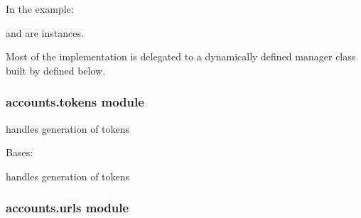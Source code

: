 \documentclass[letterpaper,10pt,english]{sphinxmanual}
\begin{document}
\begin{fulllineitems}
\begin{fulllineitems}
In the example:

\begin{sphinxVerbatim}[commandchars=\\\{\}]
 
       
\end{sphinxVerbatim}

 and  are 
instances.

Most of the implementation is delegated to a dynamically defined manager
class built by  defined below.

\end{fulllineitems}


\end{fulllineitems}



\subsubsection{accounts.tokens module}
\label{\detokenize{accounts:module-accounts.tokens}}\label{\detokenize{accounts:accounts-tokens-module}}
handles generation of tokens

\begin{fulllineitems}
\label{\detokenize{accounts:accounts.tokens.TokenGenerator}}
Bases: 

handles generation of tokens

\end{fulllineitems}



\subsubsection{accounts.urls module}
\label{\detokenize{accounts:module-accounts.urls}}\label{\detokenize{accounts:accounts-urls-module}}
\end{document}
